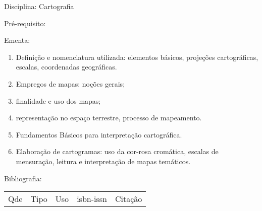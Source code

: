 \documentclass[12pt,a4paper,twoside]{report}
\begin{document}
Disciplina: Cartografia

Pré-requisito:
\begin{enumerate}
\end{enumerate}

Ementa:
\begin{enumerate}
\item Definição e nomenclatura utilizada: elementos básicos, projeções cartográficas, escalas, coordenadas geográficas.
\item Empregos de mapas: noções gerais;
\item finalidade e uso dos mapas;
\item representação no espaço terrestre, processo de mapeamento.
\item Fundamentos Básicos para interpretação cartográfica.
\item Elaboração de cartogramas: uso da cor-rosa cromática, escalas de mensuração, leitura e interpretação de mapas temáticos.
\end{enumerate}

Bibliografia:
\begin{tabular}{lllll}
Qde & Tipo & Uso & isbn-issn & Citação \\
\end{tabular}
\end{document}

